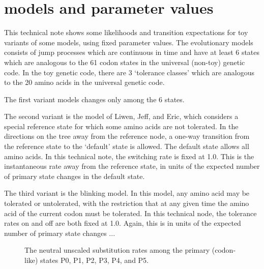 \documentclass{article}
\begin{document}
\section{models and parameter values}

This technical note shows some likelihoods and transition expectations
for toy variants of some models, using fixed parameter values.
The evolutionary models consists of jump processes which are continuous in time
and have at least 6 states which are analogous to the 61 codon states
in the universal (non-toy) genetic code.
In the toy genetic code, there are 3 `tolerance classes'
which are analogous to the 20 amino acids in the universal genetic code.

The first variant models changes only among the 6 states.

The second variant is the model of Liwen, Jeff, and Eric,
which considers a special reference state
for which some amino acids are not tolerated.
In the directions on the tree away from the reference node,
a one-way transition from the reference state to the `default'
state is allowed.
The default state allows all amino acids.
In this technical note, the switching rate is fixed at 1.0.
This is the instantaneous rate away from the reference state,
in units of the expected number of primary state changes
in the default state.

The third variant is the blinking model.
In this model, any amino acid may be tolerated or untolerated,
with the restriction that at any given time the amino acid of the current
codon must be tolerated.
In this technical node, the tolerance rates on and off are both fixed at 1.0.
Again, this is in units of the expected number of primary state changes
...


\begin{figure}
\centering
{}
\caption{
	The neutral unscaled substitution rates
	among the primary (codon-like) states
	P0, P1, P2, P3, P4, and P5.
}
\end{figure}
\end{document}
